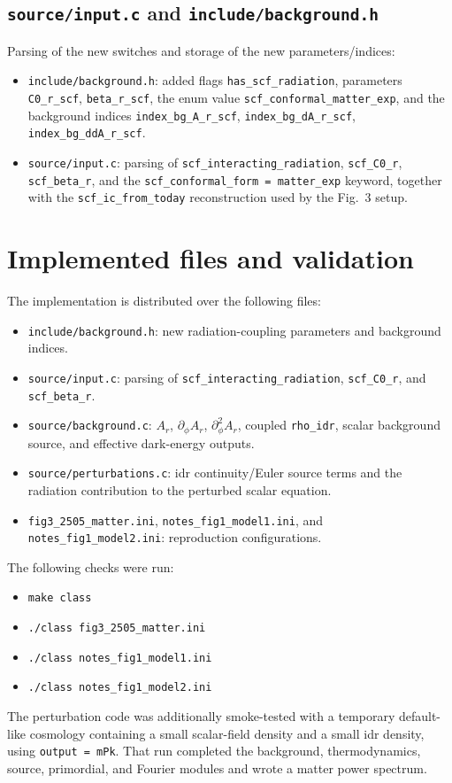 \documentclass[11pt,a4paper,english,twoside]{article}
\def\del{\partial}
\def\Ar{A_r}
\begin{document}
\subsection{\texttt{source/input.c} and \texttt{include/background.h}}

Parsing of the new switches and storage of the new parameters/indices:
\begin{itemize}[leftmargin=*]
\item \texttt{include/background.h}: added flags \texttt{has\_scf\_radiation},
parameters \texttt{C0\_r\_scf}, \texttt{beta\_r\_scf}, the enum value
\texttt{scf\_conformal\_matter\_exp}, and the background indices
\texttt{index\_bg\_A\_r\_scf}, \texttt{index\_bg\_dA\_r\_scf},
\texttt{index\_bg\_ddA\_r\_scf}.
\item \texttt{source/input.c}: parsing of \texttt{scf\_interacting\_radiation},
\texttt{scf\_C0\_r}, \texttt{scf\_beta\_r}, and the
\texttt{scf\_conformal\_form = matter\_exp} keyword, together with the
\texttt{scf\_ic\_from\_today} reconstruction used by the Fig.~3 setup.
\end{itemize}

\section{Implemented files and validation}

The implementation is distributed over the following files:
\begin{itemize}[leftmargin=*]
\item \texttt{include/background.h}: new radiation-coupling parameters and background indices.
\item \texttt{source/input.c}: parsing of \texttt{scf\_interacting\_radiation},
\texttt{scf\_C0\_r}, and \texttt{scf\_beta\_r}.
\item \texttt{source/background.c}: $\Ar$, $\del_\phi\Ar$, $\del^2_\phi\Ar$, coupled
\texttt{rho\_idr}, scalar background source, and effective dark-energy outputs.
\item \texttt{source/perturbations.c}: idr continuity/Euler source terms and the
radiation contribution to the perturbed scalar equation.
\item \texttt{fig3\_2505\_matter.ini}, \texttt{notes\_fig1\_model1.ini}, and
\texttt{notes\_fig1\_model2.ini}: reproduction configurations.
\end{itemize}

The following checks were run:
\begin{itemize}[leftmargin=*]
\item \texttt{make class}
\item \texttt{./class fig3\_2505\_matter.ini}
\item \texttt{./class notes\_fig1\_model1.ini}
\item \texttt{./class notes\_fig1\_model2.ini}
\end{itemize}
The perturbation code was additionally smoke-tested with a temporary default-like
cosmology containing a small scalar-field density and a small idr density, using
\texttt{output = mPk}.  That run completed the background, thermodynamics, source,
primordial, and Fourier modules and wrote a matter power spectrum.
\end{document}
